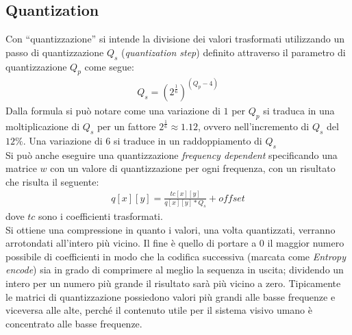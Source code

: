 \subsection{Quantization}
Con ``quantizzazione'' si intende la divisione dei valori trasformati 
utilizzando un passo di quantizzazione $Q_s$ (\emph{quantization step}) definito
 attraverso il parametro di quantizzazione $Q_p$ come segue:
\begin{align*}
Q_s = \left(2^{\frac{1}{6}}\right)^{(Q_p-4)}
\end{align*}
Dalla formula si può notare come una variazione di $1$ per $Q_p$ si traduca in 
una moltiplicazione di $Q_s$ per un fattore $2^{\frac{1}{6}}\approx 1.12$, ovvero 
nell'incremento di $Q_s$ del $12\%$. Una variazione di $6$ si traduce in un 
raddoppiamento di $Q_s$ \\
Si può anche eseguire una quantizzazione \emph{frequency dependent} specificando
 una matrice $w$ con un valore di quantizzazione per ogni frequenza, con un 
risultato che risulta il seguente:
\begin{align*}
q[x][y] = \frac{tc[x][y]}{q[x][y]*Q_s}+offset
\end{align*}
dove $tc$ sono i coefficienti trasformati. \\
Si ottiene una compressione in quanto i valori, una volta quantizzati, verranno 
arrotondati all'intero più vicino. Il fine è quello di portare a 0 il maggior 
numero possibile di coefficienti in modo che la codifica successiva (marcata 
come \emph{Entropy encode}) sia in grado di comprimere al meglio la sequenza in 
uscita; dividendo un intero per un numero più grande il risultato sarà più 
vicino a zero. Tipicamente le matrici di quantizzazione possiedono valori più 
grandi alle basse frequenze e viceversa alle alte, perché il contenuto utile 
per il sistema visivo umano è concentrato alle basse frequenze.


